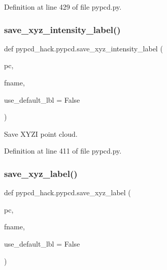 Definition at line 429 of file pypcd.\+py.

\mbox{\label{namespacepypcd__hack_1_1pypcd_a7bd8687c8696e464c057ac6e94fed02c}} 
\subsubsection{\texorpdfstring{save\+\_\+xyz\+\_\+intensity\+\_\+label()}{save\_xyz\_intensity\_label()}}
{\footnotesize\ttfamily def pypcd\+\_\+hack.\+pypcd.\+save\+\_\+xyz\+\_\+intensity\+\_\+label (\begin{DoxyParamCaption}\item[{}]{pc,  }\item[{}]{fname,  }\item[{}]{use\+\_\+default\+\_\+lbl = {\ttfamily False} }\end{DoxyParamCaption})}

\begin{DoxyVerb}Save XYZI point cloud.
\end{DoxyVerb}
 

Definition at line 411 of file pypcd.\+py.

\mbox{\label{namespacepypcd__hack_1_1pypcd_a83a5e64283fc67becc4380ae964a269d}} 
\subsubsection{\texorpdfstring{save\+\_\+xyz\+\_\+label()}{save\_xyz\_label()}}
{\footnotesize\ttfamily def pypcd\+\_\+hack.\+pypcd.\+save\+\_\+xyz\+\_\+label (\begin{DoxyParamCaption}\item[{}]{pc,  }\item[{}]{fname,  }\item[{}]{use\+\_\+default\+\_\+lbl = {\ttfamily False} }\end{DoxyParamCaption})}

